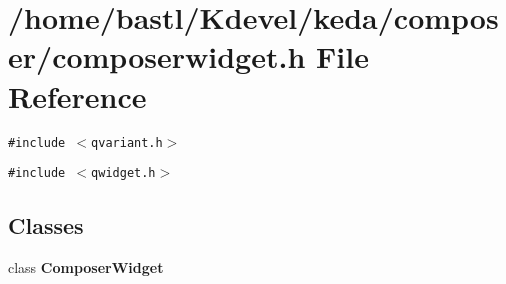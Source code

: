 \section{/home/bastl/Kdevel/keda/composer/composerwidget.h File Reference}
\label{composerwidget_8h}
{\tt \#include $<$qvariant.h$>$}\par
{\tt \#include $<$qwidget.h$>$}\par
\subsection*{Classes}
\begin{CompactItemize}
\item 
class {\bf Composer\-Widget}
\end{CompactItemize}
